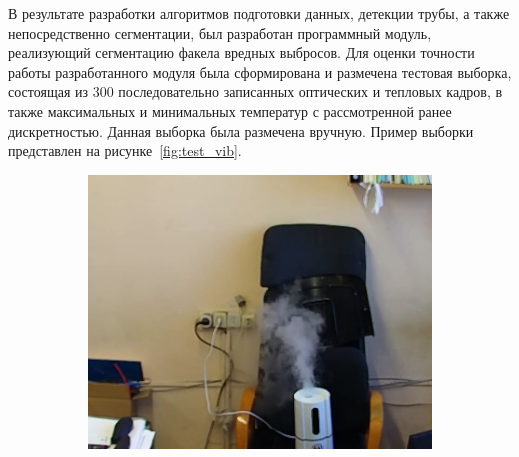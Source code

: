 \documentclass[14pt, a4paper]{extreport}
\begin{document}
	В результате разработки алгоритмов подготовки данных, детекции трубы, а также непосредственно сегментации, был разработан программный модуль, реализующий сегментацию факела вредных выбросов. Для оценки точности работы разработанного модуля была сформирована и размечена тестовая выборка, состоящая из 300 последовательно записанных оптических и тепловых кадров, в также максимальных и минимальных температур с рассмотренной ранее дискретностью. Данная выборка была размечена вручную. Пример выборки представлен на рисунке~\ref{fig:test_vib}.
	
	\begin{figure}[h!]
		\vspace*{0.22cm}
		\begin{subfigure}{.32\textwidth}
			\centering
			\includegraphics[width = \textwidth]{image/chapter_3/examples/img/185}
		\end{subfigure}

\end{figure}
\end{document}
